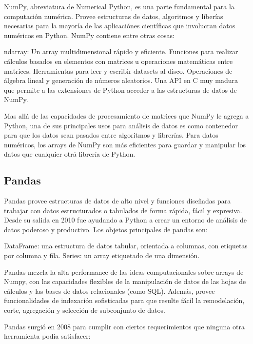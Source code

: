 NumPy, abreviatura de Numerical Python, es una parte fundamental para la computación numérica. Provee estructuras de datos, algoritmos y liberías necesarias para la mayoría de las aplicaciónes científicas que involucran datos numéricos en Python. NumPy contiene entre otras cosas:
\begin{outline}
    \1 ndarray: Un array multidimensional rápido y eficiente.
    \1 Funciones para realizar cálculos basados en elementos con matrices u operaciones matemáticas entre matrices.
    \1 Herramientas para leer y escribir datasets al disco.
    \1 Operaciones de álgebra lineal y generación de números aleatorios.
    \1 Una API en C muy madura que permite a las extensiones de Python acceder a las estructuras de datos de NumPy.
\end{outline}
Mas allá de las capacidades de procesamiento de matrices que NumPy le agrega a Python, una de sus principales usos para análisis de datos es como contenedor para que los datos sean pasados entre algoritmos y librerías. Para datos numéricos, los arrays de NumPy son más eficientes para guardar y manipular los datos que cualquier otrá librería de Python.


\subsection[Pandas]{Pandas}

Pandas provee estructuras de datos de alto nivel y funciones diseñadas para trabajar con datos estructurados o tabulados de forma rápida, fácil y expresiva. Desde su salida en 2010 fue ayudando a Python a crear un entorno de análisis de datos poderoso y productivo. Los objetos principales de pandas son: 
\begin{outline}
    \1 DataFrame: una estructura de datos tabular, orientada a columnas, con etiquetas por columna y fila.
    \1 Series: un array etiquetado de una dimensión.
\end{outline}

Pandas mezcla la alta performance de las ideas computacionales sobre arrays de Numpy, con las capacidades flexibles de la manipulación de datos de las hojas de cálculos y las bases de datos relacionales (como SQL). Además, provee funcionalidades de indexación sofisticadas para que resulte fácil la remodelación, corte, agregación y selección de subconjunto de datos.

Pandas surgió en 2008 para cumplir con ciertos requerimientos que ninguna otra herramienta podía satisfacer:

